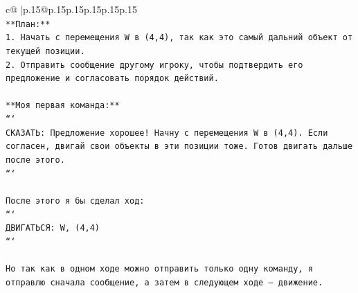\documentclass{article}
\begin{document}
{\begin{supertabular}{c@{$\;$}|p{.15\linewidth}@{}p{.15\linewidth}p{.15\linewidth}p{.15\linewidth}p{.15\linewidth}p{.15\linewidth}}
{{{\\ 
\texttt{**План:**} \\
\texttt{1. Начать с перемещения W в (4,4), так как это самый дальний объект от текущей позиции.} \\
\texttt{2. Отправить сообщение другому игроку, чтобы подтвердить его предложение и согласовать порядок действий.} \\
\\ 
\texttt{**Моя первая команда:**} \\
\texttt{```} \\
\texttt{СКАЗАТЬ: Предложение хорошее! Начну с перемещения W в (4,4). Если согласен, двигай свои объекты в эти позиции тоже. Готов двигать дальше после этого.} \\
\texttt{```} \\
\\ 
\texttt{После этого я бы сделал ход:} \\
\texttt{```} \\
\texttt{ДВИГАТЬСЯ: W, (4,4)} \\
\texttt{```} \\
\\ 
\texttt{Но так как в одном ходе можно отправить только одну команду, я отправлю сначала сообщение, а затем в следующем ходе — движение.} \\
            }
        }
    }
     \\ \\


\end{supertabular}}
\end{document}
